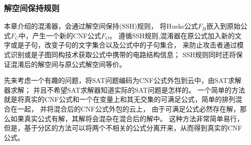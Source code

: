 \subsubsection{解空间保持规则}

本章介绍的混淆器，会通过解空间保持(SSH)规则，
将Husks公式$F_H$嵌入到原始公式$F_C$中，产生一个新的CNF公式$F_O$。
遵循SSH规则,混淆器在原公式加入新的文字或是子句，改变子句的文字集合以及公式中的子句集合，
来防止攻击者通过模式识别或是子图同构技术获取公式中携带的电路结构信息；
SSH规则同时还将保证混淆后的解空间与原公式解空间等价。

先来考虑一个有趣的问题，将SAT问题编码为CNF公式外包到云中，由SAT求解器求解；
并且不希望SAT求解器知道实际的SAT问题是怎样的。
一个简单的方法就是将真实的CNF公式和一个在变量上和其无交集的可满足公式，简单的排列混合在一起，
并将混合后的CNF公式外包的云上，
由于可满足公式必然存在解，那么如果真实公式有解，其解将会混杂在混合后的解中。
这种方法非常简单易行，
但是，基于分区\cite{Partition}的方法可以将两个不相关的公式分离开来，从而得到真实的CNF公式。

